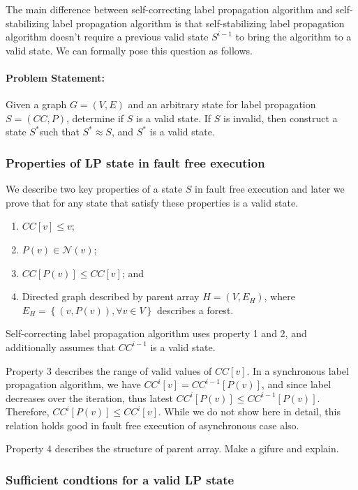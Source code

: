 The main difference between self-correcting label propagation algorithm
and self-stabilizing label propagation algorithm is that self-stabilizing
label propagation algorithm doesn't require a previous valid state
$S^{i-1}$ to bring the algorithm to a valid state. We can formally
pose this question as follows.

\paragraph*{Problem Statement:}

Given a graph $G=\left(V,E\right)$ and an arbitrary state for label
propagation $S=\left(CC,P\right)$, determine if $S$ is a valid state.
If $S$ is invalid, then construct a state $S^{*}$such that $S^{*}\approx S$,
and $S^{*}$ is a valid state. 

\subsubsection{Properties of LP state in fault free execution}

We describe two key properties of a state $S$ in fault free execution
and later we prove that for any state that satisfy these properties
is a valid state. 
\begin{enumerate}
\item $CC[v]\leq v$;
\item $P(v)\in\mathcal{N}(v)$;
\item $CC[P(v)]\leq CC[v]$; and 
\item Directed graph described by parent array $H=(V,E_{H})$, where $E_{H}=\left\{ (v,P(v)),\forall v\in V\right\} $
describes a forest. 
\end{enumerate}
Self-correcting label propagation algorithm uses property 1 and 2,
and additionally assumes that $CC^{i-1}$ is a valid state. 

Property 3 describes the range of valid values of $CC[v]$. In a synchronous
label propagation algorithm, we have $CC^{i}[v]=CC^{i-1}[P(v)]$,
and since label decreases over the iteration, thus latest $CC^{i}[P(v)]\leq CC^{i-1}[P(v)]$.
Therefore, $CC^{i}[P(v)]\leq CC^{i}[v]$. While we do not show here
in detail, this relation holds good in fault free execution of asynchronous
case also. 

Property 4 describes the structure of parent array. Make a gifure
and explain. 

\subsubsection{Sufficient condtions for a valid LP state }

